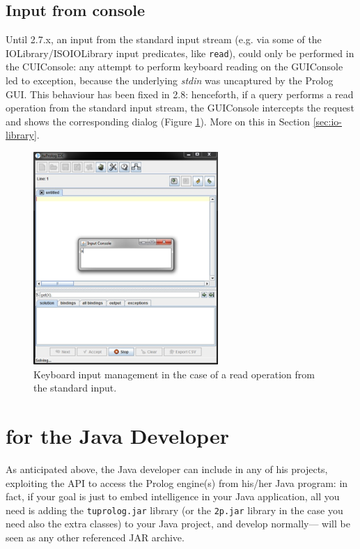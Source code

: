 \subsection{Input from console}
\label{ssec:input-from-console}

Until \tuprolog{} 2.7.x, an input from the standard input stream (e.g. via some of the IOLibrary/ISOIOLibrary input predicates, like \texttt{read}), could only be performed in the CUIConsole: any attempt to perform keyboard reading on the GUIConsole led to exception, because the underlying \emph{stdin} was uncaptured by the Prolog GUI.
This behaviour has been fixed in \tuprolog{} 2.8: henceforth, if a query performs a read operation from the standard input stream, the GUIConsole intercepts the request and shows the corresponding dialog (Figure \ref{fig:gui-InputFromConsole}). More on this in Section \ref{sec:io-library}.

\begin{figure}
\centering
  \includegraphics[width=7cm]{images/gui-InputFromConsole.png}
  \caption{Keyboard input management in the case of a read operation from the standard input.}\label{fig:gui-InputFromConsole}
\end{figure}

\section{\tuprolog{} for the Java Developer}
\label{sec:java-user-perspective}

As anticipated above, the Java developer can include \tuprolog{} in any of his projects, exploiting the \tuprolog{} API to access the Prolog engine(s) from his/her Java program: in fact, if your goal is just to embed intelligence in your Java application, all you need is adding the \texttt{tuprolog.jar} library (or the \texttt{2p.jar} library in the case you need also the extra classes) to your Java project, and develop normally---\tuprolog{} will be seen as any other referenced JAR archive.

